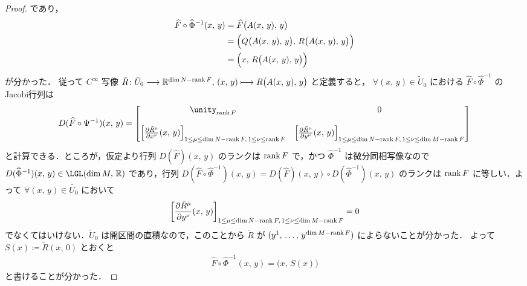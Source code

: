 \documentclass[TQFT_main]{subfiles}
\begin{document}
\begin{proof}
    であり，
    \begin{align}
        \widehat{F} \circ \widehat{\Phi}^{-1} (x,\, y)
        &= \widehat{F} \bigl( A(x,\, y),\, y \bigr)  \\
        &= \Bigl( Q \bigl( A(x,\, y),\, y \bigr),\,  R \bigl( A(x,\, y),\, y \bigr)  \Bigr) \\
        &= \Bigl( x,\,  R \bigl( A(x,\, y),\, y \bigr)  \Bigr)
    \end{align}
    が分かった．
    従って $C^\infty$ 写像 $\tilde{R} \colon \tilde{U}_0 \longrightarrow \mathbb{R}^{\dim N -\rank F},\, (x,\, y) \longmapsto R \bigl( A(x,\, y),\, y \bigr)$ と定義すると，
    $\forall (x,\, y) \in \tilde{U}_0$ における $\widehat{F} \circ \widehat{\Phi}^{-1}$ のJacobi行列は
    \begin{align}
        D (\widehat{F} \circ \Psi^{-1}) (x,\, y) =
        \mqty[
            \unity_{\rank F} & 0 \\
            & \\
            \left[\pdv{\tilde{R}^\mu}{x^\nu}()(x,\, y)\right]_{1 \le \mu \le \dim N - \rank F,\, 1 \le \nu \le \rank F} & \left[\pdv{\tilde{R}^\mu}{y^\nu}()(x,\, y)\right]_{1 \le \mu \le \dim N - \rank F,\, 1 \le \nu \le \dim M - \rank F} \\ 
        ]
    \end{align}
    と計算できる．ところが，仮定より行列 $D(\widehat{F})(x,\, y)$ のランクは $\rank F$ で，かつ $\widehat{\Phi}^{-1}$ は微分同相写像なので $D(\widehat{\Phi}^{-1})(x,\, y) \in \LGL(\dim M,\, \mathbb{R})$ であり，行列 $D (\widehat{F} \circ \widehat{\Phi}^{-1})(x,\, y) = D(\widehat{F})(x,\, y) \circ D(\widehat{\Phi}^{-1})(x,\, y)$ のランクは $\rank F$ に等しい．よって $\forall (x,\, y) \in \tilde{U_0}$ において
    \begin{align}
        \left[\pdv{\tilde{R}^\mu}{y^\nu}()(x,\, y)\right]_{1 \le \mu \le \dim N - \rank F,\, 1 \le \nu \le \dim M - \rank F} = 0
    \end{align}
    でなくてはいけない．$\tilde{U}_0$ は開区間の直積なので，このことから $\tilde{R}$ が $(y^1,\, \dots,\, y^{\dim M - \rank F})$ によらないことが分かった．
    よって $S(x) \coloneqq \tilde{R}(x,\, 0)$ とおくと
    \begin{align}
        \label{eq:thm-rank-1}
        \widehat{F} \circ \widehat{\Phi}^{-1}(x,\, y) = \bigl( x,\, S(x) \bigr) 
    \end{align}
    と書けることが分かった．


\end{proof}
\end{document}
